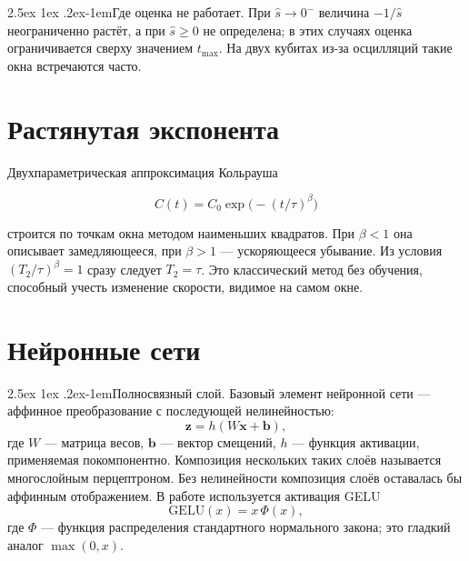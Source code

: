 \documentclass[12pt,a4paper]{report}
\makeatletter
\renewcommand\paragraph{\@startsection{paragraph}{4}{\z@}%
  {2.5ex \@plus1ex \@minus.2ex}{-1em}{\normalfont\normalsize\bfseries}}
\numberwithin{equation}{chapter}
\makeatother
\begin{document}
\paragraph{Где оценка не работает.} При $\hat s\to0^-$ величина $-1/\hat s$
неограниченно растёт, а при $\hat s\ge0$ не определена; в этих случаях оценка
ограничивается сверху значением $t_{\max}$. На двух кубитах из-за осцилляций
такие окна встречаются часто.

\section{Растянутая экспонента}

Двухпараметрическая аппроксимация Кольрауша
\begin{keybox}
\begin{equation}
C(t)=C_0\exp\bigl(-(t/\tau)^\beta\bigr)
\end{equation}
\end{keybox}
строится по точкам окна методом наименьших квадратов. При $\beta<1$ она
описывает замедляющееся, при $\beta>1$ --- ускоряющееся убывание. Из условия
$(T_2/\tau)^\beta=1$ сразу следует $T_2=\tau$. Это классический метод без
обучения, способный учесть изменение скорости, видимое на самом окне.

\section{Нейронные сети}

\paragraph{Полносвязный слой.} Базовый элемент нейронной сети --- аффинное
преобразование с последующей нелинейностью:
\begin{equation}
\mathbf z=h(W\mathbf x+\mathbf b),
\end{equation}
где $W$ --- матрица весов, $\mathbf b$ --- вектор смещений, $h$ --- функция
активации, применяемая покомпонентно. Композиция нескольких таких слоёв
называется многослойным перцептроном. Без нелинейности композиция слоёв
оставалась бы аффинным отображением. В работе используется активация GELU
\begin{equation}
\mathrm{GELU}(x)=x\,\Phi(x),
\end{equation}
где $\Phi$ --- функция распределения стандартного нормального закона; это
гладкий аналог $\max(0,x)$.
\end{document}
